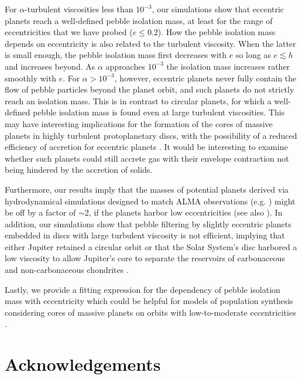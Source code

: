 \documentclass[fleqn,usenatbib]{mnras}
\begin{document}
For $\alpha$-turbulent viscosities less than $10^{-3}$, our simulations show that eccentric planets reach a well-defined pebble isolation mass, at least for the range of eccentricities that we have probed ($e\leq0.2$). How the pebble isolation mass depends on eccentricity is also related to the turbulent viscosity. When the latter is small enough, the pebble isolation mass first decreases with $e$ so long as $e \lesssim h$ and increases beyond. As $\alpha$ approaches $10^{-3}$ the isolation mass increases rather smoothly with $e$. For $\alpha > 10^{-3}$, however, eccentric planets never fully contain the flow of pebble particles beyond the planet orbit, and such planets do not strictly reach an isolation mass. This is in contrast to circular planets, for which a well-defined pebble isolation mass is found even at large turbulent viscosities. This may have interesting implications for the formation of the cores of massive planets in highly turbulent protoplanetary discs, with the possibility of a reduced efficiency of accretion for eccentric planets \citep[][]{LO2018,2021A&A...647A.175O}. It would be interesting to examine whether such planets could still accrete gas with their envelope contraction not being hindered by the accretion of solids. 

Furthermore, our results imply that the masses of potential planets derived via hydrodynamical simulations designed to match ALMA observations (e.g. \citealt{Zhang2018}) might be off by a factor of $\sim$2, if the planets harbor low eccentricities (see also \citealp{YXChen21}). In addition, our simulations show that pebble filtering by slightly eccentric planets embedded in discs with large turbulent viscosity is not efficient, implying that either Jupiter retained a circular orbit or that the Solar System's disc harbored a low viscosity to allow Jupiter's core to separate the reservoirs of carbonaceous and non-carbonaceous chondrites \citep{Kruijer2017}.

Lastly, we provide a fitting expression for the dependency of pebble isolation mass with eccentricity which could be helpful for models of population synthesis considering cores of massive planets on orbits with low-to-moderate eccentricities \citep[][]{PMID:26289203,2016ApJ...825...63C,2019A&A...623A..88B,2020A&A...643A..66B,2021A&A...650A.116M,Izidoro21}.


\section*{Acknowledgements}
\end{document}
